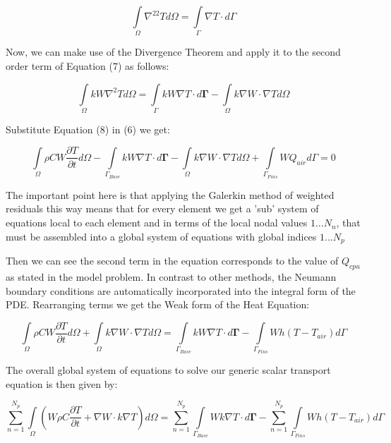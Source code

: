 \documentclass[12pt]{article}
\begin{document}
	$$
	\int\limits_{\Omega} \nabla^22 T d\Omega = \int\limits_{\Gamma} \nabla T \cdot d\Gamma 
	$$
	
Now, we can make use of the Divergence Theorem and apply it to the second order term of Equation (7) as follows:	
	
	\begin{equation}
	\int\limits_{\Omega} k W \nabla^2 T d\Omega = \int\limits_{\Gamma} {kW\nabla T} \cdot d \mathbf{\Gamma} - \int\limits_{\Omega} k \nabla W \cdot \nabla T d\Omega
	\end{equation}

	Substitute Equation (8) in (6) we get:
	
	\begin{equation}
	\int\limits_{\Omega} \rho C W \frac{\partial T}{\partial t} d\Omega -  \int\limits_{\Gamma_{Base}} {kW\nabla T} \cdot d \mathbf{\Gamma} - \int\limits_{\Omega} k \nabla  W \cdot \nabla T d\Omega + \int\limits_{\Gamma_{Fins}} W Q_{air} d\Gamma = 0
	\end{equation}
	
	The important point here is that applying the Galerkin method of weighted residuals this way means that for every element we get a 'sub' system of equations local to each element and in terms of the local nodal values $1...N_n$, that must be assembled
into a global system of equations with global indices $1...N_p$
		
	Then we can see the second term in the equation corresponds to the value of $Q_{cpu}$ as stated in the model problem. In contrast to other methods, the Neumann boundary conditions are automatically incorporated into the integral form of the PDE. Rearranging terms we get the Weak form of the Heat Equation:

	\begin{equation}
	\int\limits_{\Omega} \rho C W \frac{\partial T}{\partial t} d\Omega + \int\limits_{\Omega} k \nabla W \cdot \nabla T d\Omega = \int\limits_{\Gamma_{Base}} {kW\nabla T} \cdot d \mathbf{\Gamma} - \int\limits_{\Gamma_{Fins}} W {h(T-T_{air})} d\Gamma
	\end{equation}

The overall global system of equations to solve our generic scalar transport equation is then given by:

	\begin{equation}
	\sum_{n=1}^{N_p}\int\limits_{\Omega} (W \rho C \frac{\partial T}{\partial t} + \nabla W \cdot k \nabla T) d\Omega = \sum_{n=1}^{N_p} \int\limits_{\Gamma_{Base}} {Wk\nabla T} \cdot d \mathbf{\Gamma} - \sum_{n=1}^{N_p} \int\limits_{\Gamma_{Fins}} W {h(T-T_{air})} d\Gamma
	\end{equation}
\end{document}
